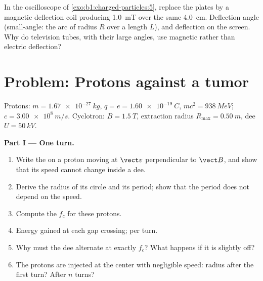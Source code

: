 \begin{exercise}[$\star\star\star$]\label{exo:b1:charged-particles:12}
In the oscilloscope of \cref{exo:b1:charged-particles:5}, replace the
plates by a magnetic deflection coil producing \qty{1.0}{mT} over the
same \qty{4.0}{cm}. Deflection angle (small-angle: the arc of radius $R$
over a length $L$), and deflection on the screen. Why do television
tubes, with their large angles, use magnetic rather than electric
deflection?
\end{exercise}

\section{Problem: Protons against a tumor}

\begin{problem}
\label{pb:b1:charged-particles:1}
Protons: $m = \qty{1.67e-27}{kg}$, $q = e = \qty{1.60e-19}{C}$, $mc^2 =
\qty{938}{MeV}$; $c = \qty{3.00e8}{m/s}$. Cyclotron: $B = \qty{1.5}{T}$,
extraction radius $R_{\max} = \qty{0.50}{m}$, dee  
$U = \qty{50}{kV}$.

\medskip
\noindent\textbf{Part I --- One turn.}
\begin{enumerate}
  \item Write the  on a proton moving at $\vect v$
        perpendicular to $\vect B$, and show that its speed cannot change
        inside a dee.
  \item Derive the radius of its circle and its period; show that the
        period does not depend on the speed.
  \item Compute the  $f_c$ for these protons.
  \item Energy gained at each gap crossing; per turn.
  \item Why must the dee  alternate at exactly $f_c$? What happens
        if it is slightly off?
  \item The protons are injected at the center with negligible speed:
        radius after the first turn? After $n$ turns?
\end{enumerate}


\end{problem}
